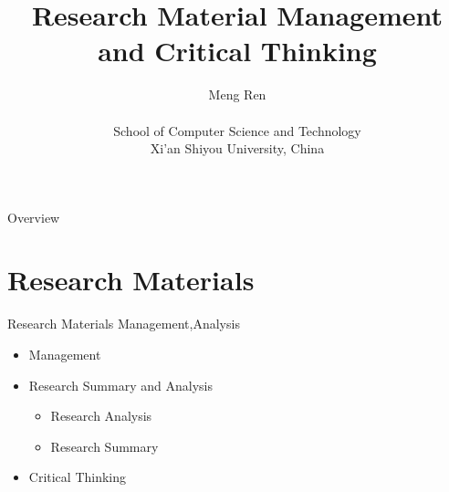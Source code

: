 \documentclass[
 size=14pt,
 paper=smartboard,  %
 mode=present, 		%
 display=slides, 	%
 style=tuliplab,  	%
 pauseslide,
 fleqn,leqno]{powerdot}{}
\title{Research Material Management and Critical Thinking}
\author{
Meng Ren
\\
\\School of Computer Science and Technology
\\Xi'an Shiyou University, China
}
\date{\gitCommitterDate}
\begin{document}
\maketitle

\begin{slide}[toc=,bm=]{Overview}
\tableofcontents[content=currentsection,type=1]
\end{slide}
\section{Research Materials}
\begin{slide}[toc=,bm=]{Research Materials Management,Analysis}

\begin{itemize}
  \item Management
  \item Research Summary and Analysis
  \begin{itemize}
  \item Research Analysis
  \item Research Summary
  \end{itemize}
  \item Critical Thinking
\end{itemize}
\end{slide}
\end{document}
